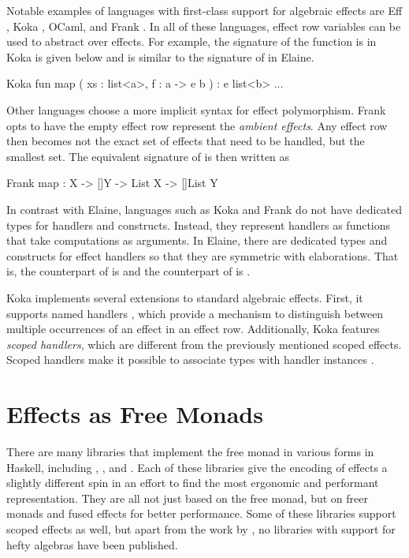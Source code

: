 Notable examples of languages with first-class support for algebraic effects are Eff \autocite{bauer_programming_2015}, Koka \autocite{leijen_koka_2014}, OCaml\citationneeded, and Frank \autocite{lindley_be_2017}. In all of these languages, effect row variables can be used to abstract over effects. For example, the signature of the  function is in Koka is given below and is similar to the signature of  in Elaine.
%
\begin{lst}{Koka}
fun map ( xs : list<a>, f : a -> e b ) : e list<b>
    ...
\end{lst}
%
Other languages choose a more implicit syntax for effect polymorphism. Frank \autocite{lindley_be_2017} opts to have the empty effect row represent the \emph{ambient effects}. Any effect row then becomes not the exact set of effects that need to be handled, but the smallest set. The equivalent signature of  is then written as
%
\begin{lst}{Frank}
map : {X -> []Y} -> List X -> []List Y
\end{lst}
%
In contrast with Elaine, languages such as Koka and Frank do not have dedicated types for handlers and  constructs. Instead, they represent handlers as functions that take computations as arguments. In Elaine, there are dedicated types and constructs for effect handlers so that they are symmetric with elaborations. That is, the counterpart of  is  and the counterpart of  is .

Koka implements several extensions to standard algebraic effects. First, it supports named handlers \autocite{xie_first-class_2022}, which provide a mechanism to distinguish between multiple occurrences of an effect in an effect row. Additionally, Koka features \emph{scoped handlers}, which are different from the previously mentioned scoped effects. Scoped handlers make it possible to associate types with handler instances \autocite{xie_first-class_2022}.

\section{Effects as Free Monads}

There are many libraries that implement the free monad in various forms in Haskell, including , ,  and . Each of these libraries give the encoding of effects a slightly different spin in an effort to find the most ergonomic and performant representation. They are all not just based on the free monad, but on freer monads \autocite{kiselyov_freer_2016} and fused effects \autocite{hinze_fusion_2015} for better performance. Some of these libraries support scoped effects as well, but apart from the work by \textcite{bach_poulsen_hefty_2023}, no libraries with support for hefty algebras have been published.

